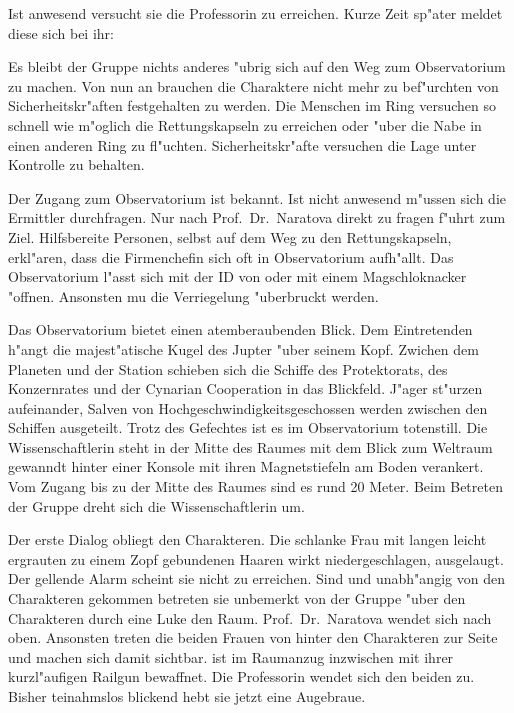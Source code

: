 Ist \ml{} anwesend versucht sie die Professorin zu erreichen. Kurze Zeit sp"ater meldet diese sich bei ihr:


Es bleibt der Gruppe nichts anderes "ubrig sich auf den Weg zum Observatorium zu machen. Von nun an brauchen die Charaktere nicht mehr zu bef"urchten von Sicherheitskr"aften festgehalten zu werden. Die Menschen im Ring versuchen so schnell wie m"oglich die Rettungskapseln zu erreichen oder "uber die Nabe in einen anderen Ring zu fl"uchten. Sicherheitskr"afte versuchen die Lage unter Kontrolle zu behalten.

Der Zugang zum Observatorium ist \ml{} bekannt. Ist \ml{} nicht anwesend m"ussen sich die Ermittler durchfragen. Nur nach Prof.~Dr.~Naratova direkt zu fragen f"uhrt zum Ziel. Hilfsbereite Personen, selbst auf dem Weg zu den Rettungskapseln, erkl"aren, dass die Firmenchefin sich oft in  Observatorium aufh"allt. Das Observatorium l"asst sich mit der ID von \ml{} oder mit einem Magschlo\3knacker "offnen. Ansonsten mu\3 die Verriegelung "uberbruckt werden.

Das Observatorium bietet einen atemberaubenden Blick. Dem Eintretenden h"angt die majest"atische Kugel des Jupter "uber seinem Kopf. Zwichen dem Planeten und der Station schieben sich die Schiffe des Protektorats, des Konzernrates und der Cynarian Cooperation in das Blickfeld. J"ager st"urzen aufeinander, Salven von Hochgeschwindigkeitsgeschossen werden zwischen den Schiffen ausgeteilt. Trotz des Gefechtes ist es im Observatorium totenstill. Die Wissenschaftlerin steht in der Mitte des Raumes mit dem Blick zum Weltraum gewanndt hinter einer Konsole mit ihren Magnetstiefeln am Boden verankert. Vom Zugang bis zu der Mitte des Raumes sind es rund 20 Meter. Beim Betreten der Gruppe dreht sich die Wissenschaftlerin um.


Der erste Dialog obliegt den Charakteren. Die schlanke Frau mit langen leicht ergrauten zu einem Zopf gebundenen Haaren wirkt niedergeschlagen, ausgelaugt. Der gellende Alarm scheint sie nicht zu erreichen. Sind \xl{} und \ml{} unabh"angig von den Charakteren gekommen betreten sie unbemerkt von der Gruppe "uber den Charakteren durch eine Luke den Raum. Prof.~Dr.~Naratova wendet sich nach oben. Ansonsten treten die beiden Frauen von hinter den Charakteren zur Seite und machen sich damit sichtbar. \xl{} ist im Raumanzug inzwischen mit ihrer kurzl"aufigen Railgun bewaffnet. Die Professorin wendet sich den beiden zu. Bisher teinahmslos blickend hebt sie jetzt eine Augebraue.

